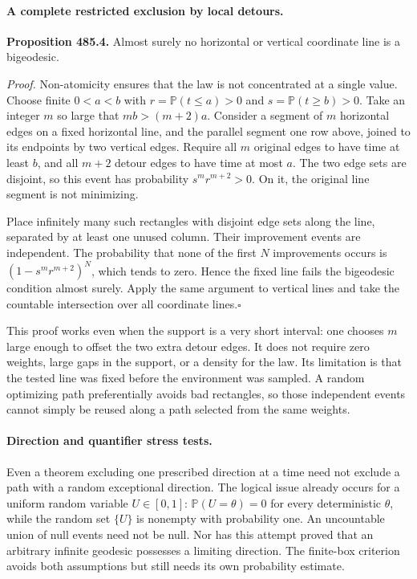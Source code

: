 \documentclass[11pt]{article}
\begin{document}
\paragraph{A complete restricted exclusion by local detours.}
\textbf{Proposition 485.4.} Almost surely no horizontal or vertical
coordinate line is a bigeodesic.

\emph{Proof.}
Non-atomicity ensures that the law is not concentrated at a single value.
Choose finite $0<a<b$ with
$r=\mathbb P(t\leq a)>0$ and $s=\mathbb P(t\geq b)>0$.
Take an integer $m$ so large that $mb>(m+2)a$.
Consider a segment of $m$ horizontal edges on a fixed horizontal line,
and the parallel segment one row above, joined to its endpoints by two
vertical edges. Require all $m$ original edges to have time at least
$b$, and all $m+2$ detour edges to have time at most $a$.
The two edge sets are disjoint, so this event has probability
$s^m r^{m+2}>0$. On it, the original line segment is not minimizing.

Place infinitely many such rectangles with disjoint edge sets along the
line, separated by at least one unused column. Their improvement events
are independent. The probability that none of the first $N$ improvements
occurs is $(1-s^m r^{m+2})^N$, which tends to zero. Hence the fixed line
fails the bigeodesic condition almost surely. Apply the same argument
to vertical lines and take the countable intersection over all coordinate
lines.\hfill$\square$

This proof works even when the support is a very short interval: one
chooses $m$ large enough to offset the two extra detour edges. It does
not require zero weights, large gaps in the support, or a density for
the law. Its limitation is that the tested line was fixed before the
environment was sampled. A random optimizing path preferentially avoids
bad rectangles, so those independent events cannot simply be reused
along a path selected from the same weights.

\paragraph{Direction and quantifier stress tests.}
Even a theorem excluding one prescribed direction at a time need not
exclude a path with a random exceptional direction. The logical issue
already occurs for a uniform random variable $U\in[0,1]$:
$\mathbb P(U=\theta)=0$ for every deterministic $\theta$, while the
random set $\{U\}$ is nonempty with probability one. An uncountable
union of null events need not be null. Nor has this attempt proved that
an arbitrary infinite geodesic possesses a limiting direction. The
finite-box criterion avoids both assumptions but still needs its own
probability estimate.
\end{document}
